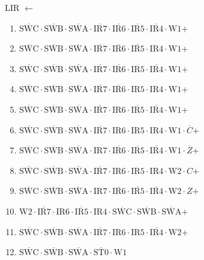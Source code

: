 \documentclass[UTF8]{ctexart}
\begin{document}
LIR $\leftarrow$
\begin{enumerate}[\indent\indent]
	\item $\overline{\text{SWC}} \cdot\overline{\text{SWB}}\cdot \overline{\text{SWA}} \cdot \overline{\text{IR7}} \cdot \overline{\text{IR6}} \cdot \overline{\text{IR5}} \cdot \overline{\text{IR4}} \cdot \text{W1}$+
	\item $\overline{\text{SWC}} \cdot\overline{\text{SWB}}\cdot \overline{\text{SWA}} \cdot \overline{\text{IR7}} \cdot \overline{\text{IR6}} \cdot \overline{\text{IR5}} \cdot \text{IR4} \cdot \text{W1}$+
	\item $\overline{\text{SWC}} \cdot\overline{\text{SWB}}\cdot \overline{\text{SWA}} \cdot \overline{\text{IR7}} \cdot \overline{\text{IR6}} \cdot \text{IR5} \cdot \overline{\text{IR4}} \cdot \text{W1}$+
	\item $\overline{\text{SWC}} \cdot\overline{\text{SWB}}\cdot \overline{\text{SWA}} \cdot \overline{\text{IR7}} \cdot \overline{\text{IR6}} \cdot \text{IR5} \cdot \text{IR4} \cdot \text{W1}$+
	\item $\overline{\text{SWC}} \cdot\overline{\text{SWB}}\cdot \overline{\text{SWA}} \cdot \overline{\text{IR7}} \cdot \text{IR6} \cdot \overline{\text{IR5}} \cdot \overline{\text{IR4}} \cdot \text{W1}$+
	\item $\overline{\text{SWC}} \cdot\overline{\text{SWB}}\cdot \overline{\text{SWA}} \cdot \overline{\text{IR7}} \cdot \text{IR6} \cdot \text{IR5} \cdot \text{IR4} \cdot \text{W1} \cdot \overline{C}$+
	\item $\overline{\text{SWC}} \cdot\overline{\text{SWB}}\cdot \overline{\text{SWA}} \cdot \text{IR7} \cdot \overline{\text{IR6}} \cdot \overline{\text{IR5}} \cdot \overline{\text{IR4}} \cdot \text{W1} \cdot \overline{Z}$+
	\item $\overline{\text{SWC}} \cdot\overline{\text{SWB}}\cdot \overline{\text{SWA}} \cdot \overline{\text{IR7}} \cdot \text{IR6} \cdot \text{IR5} \cdot \text{IR4} \cdot \text{W2} \cdot C$+
	\item $\overline{\text{SWC}} \cdot\overline{\text{SWB}}\cdot \overline{\text{SWA}} \cdot \text{IR7} \cdot \overline{\text{IR6}} \cdot \overline{\text{IR5}} \cdot \overline{\text{IR4}} \cdot \text{W2} \cdot Z$+
	\item $\text{W2} \cdot \overline{\text{IR7}} \cdot \text{IR6} \cdot \overline{\text{IR5}} \cdot \text{IR4} \cdot \overline{\text{SWC}} \cdot\overline{\text{SWB}}\cdot \overline{\text{SWA}}$+
	\item $\overline{\text{SWC}} \cdot\overline{\text{SWB}}\cdot \overline{\text{SWA}} \cdot \overline{\text{IR7}} \cdot \text{IR6} \cdot \text{IR5} \cdot \overline{\text{IR4}} \cdot \text{W2}$+
	\item $\overline{\text{SWC}}\cdot\overline{\text{SWB}}\cdot\overline{\text{SWA}}\cdot\overline{\text{ST0}}\cdot\text{W1}$
\end{enumerate}
\end{document}
